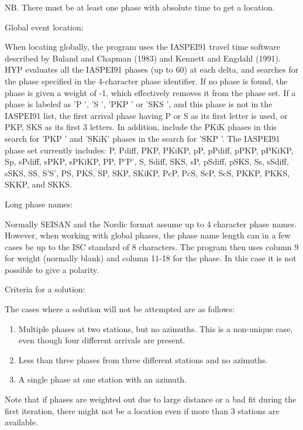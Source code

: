 NB. There must be at least one phase with absolute time to get a 
location.

Global event location: 

When locating globally, the program uses the IASPEI91 travel time software described by Buland and Chapman (1983) and Kennett and Engdahl (1991). HYP evaluates all the IASPEI91 phases (up to 60) at each delta, and searches for the phase specified in the 4-character phase identifier. If no phase is found, the phase is given a weight of -1, which effectively removes it from the phase set. If a phase is labeled as 'P ', 'S ', 'PKP ' or 'SKS ', and this phase is not in the IASPEI91 list, the first arrival phase having P or S as its first letter is used, or PKP, SKS as its first 3 letters. In addition, include the PKiK phases in this search for 'PKP ' and 'SKiK' phases in the search for 'SKP '. The IASPEI91 phase set currently includes: P, Pdiff, PKP, PKiKP, pP, pPdiff, pPKP, pPKiKP, Sp, sPdiff, sPKP, sPKiKP, PP, P'P', S, Sdiff, SKS, sP, pSdiff, pSKS, Ss, sSdiff, sSKS, SS, S'S', PS, PKS, SP, SKP, SKiKP, PcP, PcS, ScP, ScS, PKKP, PKKS, SKKP, and SKKS. 

Long phase names: 

Normally SEISAN and the Nordic format assume up to 4 character phase names. However, when working with global phases, the phase name length can in a few cases be up to the ISC standard of 8 characters. The program then uses column 9 for weight (normally blank) and column 11-18 
for the phase. In this case it is not possible to give a polarity. 

Criteria for a solution: 

The cases where a solution will not be attempted are as follows: 

\begin{enumerate}
\item Multiple phases at two stations, but no azimuths. This is a non-unique case, even though four different arrivals are present. 
\item Less than three phases from three different stations and no azimuths. 
\item A single phase at one station with an azimuth. 
\end{enumerate}

Note that if phases are weighted out due to large distance or a bad fit during the first iteration, there might not be a location even if more than 3 stations are available. 

